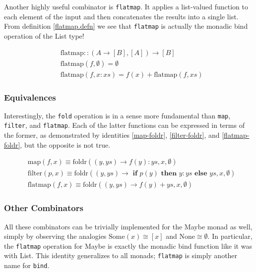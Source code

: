 Another highly useful combinator is \texttt{flatmap}. It applies a list-valued function to each element of the input and then concatenates the results into a single list. From definition \ref{flatmap.defn} we see that \texttt{flatmap} is actually the monadic bind operation of the List type!

\begin{equation}
\label{flatmap.defn}
\begin{split}
&\text{flatmap} :: (A \to [B], [A]) \to [B] \\
&\text{flatmap}(f, \emptyset) = \emptyset \\
&\text{flatmap}(f, x:xs) = f(x) + \text{flatmap}(f, xs)
\end{split}
\end{equation}

\subsubsection{Equivalences}

Interestingly, the \texttt{fold} operation is in a sense more fundamental than \texttt{map}, \texttt{filter}, and \texttt{flatmap}. Each of the latter functions can be expressed in terms of the former, as demonstrated by identities \ref{map-foldr}, \ref{filter-foldr}, and \ref{flatmap-foldr}, but the opposite is not true.

\begin{align}
& \text{map}(f, x) \equiv \text{foldr}((y, ys) \to f(y):ys, x, \emptyset) \label{map-foldr} \\
& \text{filter}(p, x) \equiv \text{foldr}((y, ys) \to \textbf{ if } p(y) \textbf{ then } y:ys \textbf{ else } ys, x, \emptyset) \label{filter-foldr} \\
& \text{flatmap}(f, x) \equiv \text{foldr}((y, ys) \to f(y)+ys, x, \emptyset) \label{flatmap-foldr} 
\end{align}

\subsubsection{Other Combinators}

All these combinators can be trivially implemented for the Maybe monad as well, simply by observing the analogies $\text{Some}(x) \cong [x]$ and $\text{None} \cong \emptyset$. In particular, the \texttt{flatmap} operation for Maybe is exactly the monadic bind function like it was with List. This identity generalizes to all monads; \texttt{flatmap} is simply another name for \texttt{bind}.

